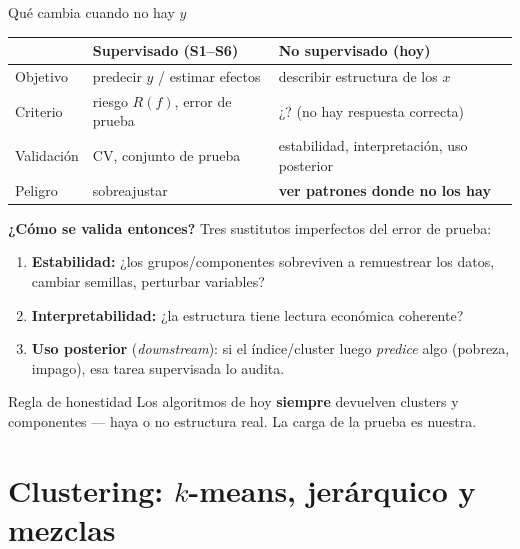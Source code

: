 \documentclass{beamer}
\newcommand{\1}{\mathbb{I}}
\begin{document}
\begin{frame}{Qué cambia cuando no hay $y$}
\small
\begin{center}
\footnotesize
\setlength{\tabcolsep}{4pt}
\begin{tabular}{lll}
\hline
 & Supervisado (S1--S6) & No supervisado (hoy) \\
\hline
Objetivo & predecir $y$ / estimar efectos & describir estructura de los $x$ \\
Criterio & riesgo $R(f)$, error de prueba & ¿? (no hay respuesta correcta) \\
Validación & CV, conjunto de prueba & estabilidad, interpretación, uso posterior \\
Peligro & sobreajustar & \textbf{ver patrones donde no los hay} \\
\hline
\end{tabular}
\end{center}
\pause

\vspace{0.25cm}
\textbf{¿Cómo se valida entonces?} Tres sustitutos imperfectos del error de prueba:
\begin{enumerate}\itemsep4pt
  \item \textbf{Estabilidad:} ¿los grupos/componentes sobreviven a remuestrear los datos, cambiar semillas, perturbar variables?
  \item \textbf{Interpretabilidad:} ¿la estructura tiene lectura económica coherente?
  \item \textbf{Uso posterior} (\emph{downstream}): si el índice/cluster luego \emph{predice} algo (pobreza, impago), esa tarea supervisada lo audita.
\end{enumerate}
\pause

\begin{block}{Regla de honestidad}
Los algoritmos de hoy \textbf{siempre} devuelven clusters y componentes --- haya o no estructura real. La carga de la prueba es nuestra.
\end{block}
\end{frame}


\section{Clustering: $k$-means, jerárquico y mezclas}
\begin{frame}[noframenumbering]
\tableofcontents[currentsection]
\end{frame}
\end{document}
